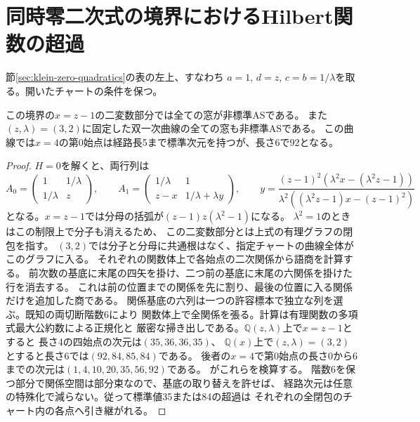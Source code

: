 \section{同時零二次式の境界におけるHilbert関数の超過}
\label{sec:zero-pairing-defect}
節\ref{sec:klein-zero-quadratics}の表の左上、すなわち
$a=1$, $d=z$, $c=b=1/\lambda$を取る。開いたチャートの条件を保つ。
\begin{proposition}
この境界の$x=z-1$の二変数部分では全ての窓が非標準ASである。
また$(z,\lambda)=(3,2)$に固定した双一次曲線の全ての窓も非標準ASである。
この曲線では$x=4$の第0始点は経路長5まで標準次元を持つが、長さ6で92となる。
\end{proposition}
\begin{proof}
$H=0$を解くと、両行列は
\[
 A_0=\begin{pmatrix}1&1/\lambda\\1/\lambda&z\end{pmatrix},\qquad
 A_1=\begin{pmatrix}1/\lambda&1\\ z-x&1/\lambda+\lambda y\end{pmatrix},\qquad
 y=\frac{(z-1)^2(\lambda^2 x-(\lambda^2z-1))}
 {\lambda^2((\lambda^2z-1)x-(z-1)^2)}
\]
となる。$x=z-1$では分母の括弧が$(z-1)z(\lambda^2-1)$になる。
$\lambda^2=1$のときはこの制限上で分子も消えるため、
この二変数部分とは上式の有理グラフの閉包を指す。
$(3,2)$では分子と分母に共通根はなく、指定チャートの曲線全体がこのグラフに入る。
それぞれの関数体上で各始点の二次関係から語商を計算する。
前次数の基底に末尾の四矢を掛け、二つ前の基底に末尾の六関係を掛けた行を消去する。
これは前の位置までの関係を先に割り、最後の位置に入る関係だけを追加した商である。
関係基底の六列は一つの許容標本で独立な列を選ぶ。既知の両切断階数6により
関数体上で全関係を張る。計算は有理関数の多項式最大公約数による正規化と
厳密な掃き出しである。$\mathbb Q(z,\lambda)$上で$x=z-1$とすると
長さ4の四始点の次元は$(35,36,36,35)$、
$\mathbb Q(x)$上で$(z,\lambda)=(3,2)$とすると長さ6では$(92,84,85,84)$である。
後者の$x=4$で第0始点の長さ0から6までの次元は$(1,4,10,20,35,56,92)$である。
がこれらを検算する。
階数6を保つ部分で関係空間は部分束なので、基底の取り替えを許せば、
経路次元は任意の特殊化で減らない。従って標準値35または84の超過は
それぞれの全閉包のチャート内の各点へ引き継がれる。
\end{proof}

